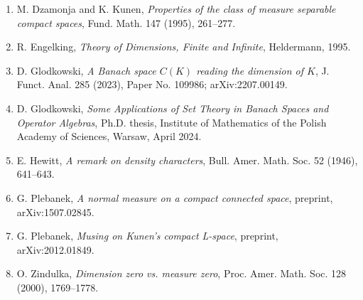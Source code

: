 \documentclass[11pt]{article}
\begin{document}
\begin{enumerate}
\item M. Dzamonja and K. Kunen, \emph{Properties of the class of measure
separable compact spaces}, Fund. Math. 147 (1995), 261--277.
\item R. Engelking, \emph{Theory of Dimensions, Finite and Infinite},
Heldermann, 1995.
\item D. Glodkowski, \emph{A Banach space \(C(K)\) reading the dimension of
\(K\)}, J. Funct. Anal. 285 (2023), Paper No. 109986; arXiv:2207.00149.
\item D. Glodkowski, \emph{Some Applications of Set Theory in Banach Spaces and
Operator Algebras}, Ph.D. thesis, Institute of Mathematics of the Polish
Academy of Sciences, Warsaw, April 2024.
\item E. Hewitt, \emph{A remark on density characters}, Bull. Amer. Math. Soc.
52 (1946), 641--643.
\item G. Plebanek, \emph{A normal measure on a compact connected space},
preprint, arXiv:1507.02845.
\item G. Plebanek, \emph{Musing on Kunen's compact L-space}, preprint,
arXiv:2012.01849.
\item O. Zindulka, \emph{Dimension zero vs. measure zero}, Proc. Amer. Math.
Soc. 128 (2000), 1769--1778.
\end{enumerate}
\end{document}
